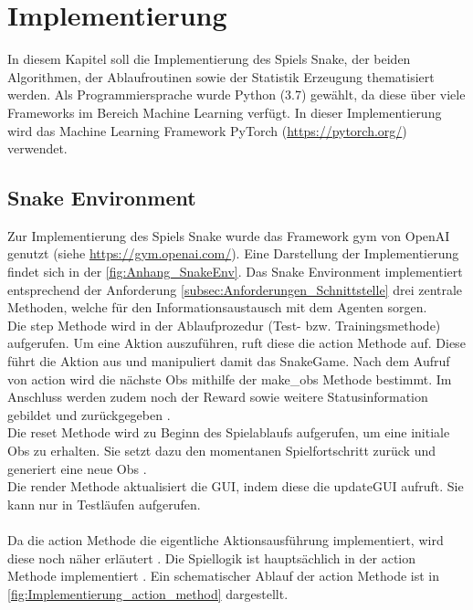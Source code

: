 \chapter{Implementierung} \label{chap:Implementierung}
In diesem Kapitel soll die Implementierung des Spiels Snake, der beiden Algorithmen, der Ablaufroutinen sowie der Statistik Erzeugung thematisiert werden. Als Programmiersprache wurde Python (3.7) gewählt, da diese über viele Frameworks im Bereich Machine Learning verfügt.
In dieser Implementierung wird das Machine Learning Framework PyTorch (\url{https://pytorch.org/}) verwendet.

\section{Snake Environment} \label{sec:Implementierung_Environment}
Zur Implementierung des Spiels Snake wurde das Framework gym von OpenAI genutzt (siehe \url{https://gym.openai.com/}). Eine Darstellung der Implementierung findet sich in der \autoref{fig:Anhang_SnakeEnv}. Das Snake Environment implementiert entsprechend der Anforderung \ref{subsec:Anforderungen_Schnittstelle} drei zentrale Methoden, welche für den Informationsaustausch mit dem Agenten sorgen.\\ 
Die step Methode  wird in der Ablaufprozedur (Test- bzw. Trainingsmethode) aufgerufen. Um eine Aktion auszuführen, ruft diese die action Methode auf. Diese führt die Aktion aus und manipuliert damit das SnakeGame.
Nach dem Aufruf von  action wird die nächste Obs mithilfe der make\_obs Methode bestimmt. Im Anschluss werden zudem noch der Reward sowie weitere Statusinformation gebildet und zurückgegeben .\\
Die reset Methode  wird zu Beginn des Spielablaufs aufgerufen, um eine initiale Obs zu erhalten. Sie setzt dazu den momentanen Spielfortschritt zurück und generiert eine neue Obs .\\
Die render Methode  aktualisiert die GUI, indem diese die updateGUI aufruft. Sie kann nur in Testläufen aufgerufen.\\
\\Da die action Methode die eigentliche Aktionsausführung implementiert, wird diese noch näher erläutert .
Die Spiellogik ist hauptsächlich in der action Methode implementiert . Ein schematischer Ablauf der action Methode ist in \autoref{fig:Implementierung_action_method} dargestellt.
